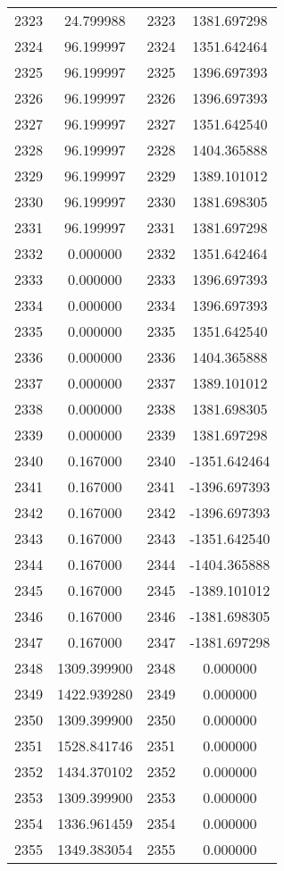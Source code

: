 \documentclass[12pt]{article}
\begin{document}
\begin{longtable}{@{}cccc@{}}
2323 & 24.799988 & 2323 & 1381.697298 \\
2324 & 96.199997 & 2324 & 1351.642464 \\
2325 & 96.199997 & 2325 & 1396.697393 \\
2326 & 96.199997 & 2326 & 1396.697393 \\
2327 & 96.199997 & 2327 & 1351.642540 \\
2328 & 96.199997 & 2328 & 1404.365888 \\
2329 & 96.199997 & 2329 & 1389.101012 \\
2330 & 96.199997 & 2330 & 1381.698305 \\
2331 & 96.199997 & 2331 & 1381.697298 \\
2332 & 0.000000 & 2332 & 1351.642464 \\
2333 & 0.000000 & 2333 & 1396.697393 \\
2334 & 0.000000 & 2334 & 1396.697393 \\
2335 & 0.000000 & 2335 & 1351.642540 \\
2336 & 0.000000 & 2336 & 1404.365888 \\
2337 & 0.000000 & 2337 & 1389.101012 \\
2338 & 0.000000 & 2338 & 1381.698305 \\
2339 & 0.000000 & 2339 & 1381.697298 \\
2340 & 0.167000 & 2340 & -1351.642464 \\
2341 & 0.167000 & 2341 & -1396.697393 \\
2342 & 0.167000 & 2342 & -1396.697393 \\
2343 & 0.167000 & 2343 & -1351.642540 \\
2344 & 0.167000 & 2344 & -1404.365888 \\
2345 & 0.167000 & 2345 & -1389.101012 \\
2346 & 0.167000 & 2346 & -1381.698305 \\
2347 & 0.167000 & 2347 & -1381.697298 \\
2348 & 1309.399900 & 2348 & 0.000000 \\
2349 & 1422.939280 & 2349 & 0.000000 \\
2350 & 1309.399900 & 2350 & 0.000000 \\
2351 & 1528.841746 & 2351 & 0.000000 \\
2352 & 1434.370102 & 2352 & 0.000000 \\
2353 & 1309.399900 & 2353 & 0.000000 \\
2354 & 1336.961459 & 2354 & 0.000000 \\
2355 & 1349.383054 & 2355 & 0.000000 \\

\end{longtable}
\end{document}
